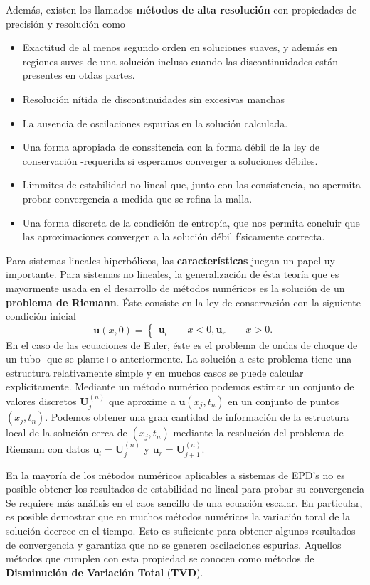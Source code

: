 Además, existen los llamados \textbf{métodos de alta resolución} con propiedades de precisión y resolución como
\begin{itemize}
\item Exactitud de al menos segundo orden en soluciones suaves, y además en regiones suves de una solución incluso cuando las discontinuidades están presentes en otdas partes.
\item Resolución nítida de discontinuidades sin excesivas manchas
\item La ausencia de oscilaciones espurias en la solución calculada.
\item Una forma apropiada de conssitencia con la forma débil de la ley de conservación -requerida si esperamos converger a soluciones débiles.
\item Limmites de estabilidad no lineal que, junto con las consistencia, no spermita probar convergencia a medida que se refina la malla.
\item Una forma discreta de la condición de entropía, que nos permita concluir que las aproximaciones convergen a la solución débil físicamente correcta.
\end{itemize}

Para sistemas lineales hiperbólicos, las \textbf{características} juegan un papel uy importante. Para sistemas no lineales, la generalización de ésta teoría que es mayormente usada en el desarrollo de métodos numéricos es la solución de un \textbf{problema de Riemann}. Éste consiste en la ley de conservación con la siguiente condición inicial
\[
\textbf{u}(x,0) 
= \begin{cases}
	\textbf{u}_\textit{l} \qquad x<0,
	\textbf{u}_\textit{r} \qquad x>0.
  \end{cases}
\]
En el caso de las ecuaciones de Euler, éste es el problema de ondas de choque de un tubo -que se plante+o anteriormente. La solución a este problema tiene una estructura relativamente simple y en muchos casos se puede calcular explícitamente. Mediante un método numérico podemos estimar un conjunto de valores discretos $\textbf{U}_j^{(n)}$ que aproxime a $\textbf{u}(x_j, t_n)$ en un conjunto de puntos ${(x_j, t_n)}$. Podemos obtener una gran cantidad de información de la estructura local de la solución cerca de $(x_j, t_n)$ mediante la resolución del problema de Riemann con datos $\textbf{u}_\textit{l} = \textbf{U}_j^{(n)}$ y $\textbf{u}_\textit{r} = \textbf{U}_{j+1}^{(n)}$. 

En la mayoría de los métodos numéricos aplicables a sistemas de EPD's no es posible obtener los resultados de estabilidad no lineal para probar su convergencia Se requiere más análisis en el caos sencillo de una ecuación escalar. En particular, es posible demostrar que en muchos métodos numéricos la variación toral de la solución decrece en el tiempo. Esto es suficiente para obtener algunos resultados de convergencia y garantiza que no se generen oscilaciones espurias. Aquellos métodos que cumplen con esta propiedad se conocen como métodos de \textbf{Disminución de Variación Total} (\textbf{TVD}).

